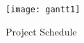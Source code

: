 \begin{figure}[h]
	\centering
	\texttt{[image: gantt1]}
	\caption{Project Schedule}
	\label{fig:projectSchedule}
\end{figure}